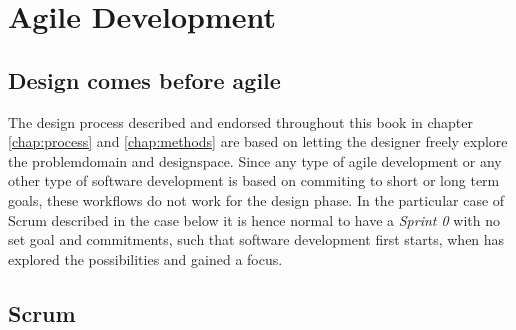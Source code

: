 \section{Agile Development} \label{sec:agile_development}

\begin{concept} \label{conc:agile} 
  
\end{concept}

\subsection{Design comes before agile} \label{sec:design_before_agile}
The design process described and endorsed throughout this book in chapter \ref{chap:process} and \ref{chap:methods} are based on letting the designer freely explore the problemdomain and designspace. Since any type of agile development or any other type of software development is based on commiting to short or long term goals, these workflows do not work for the design phase. In the particular case of Scrum described in the case below it is hence normal to have a \emph{Sprint 0} with no set goal and commitments, such that software development first starts, when has explored the possibilities and gained a focus.

\subsection{Scrum} \label{sec:scrum}

\begin{definition} \label{def:product_owner} 

\end{definition}

\begin{definition} \label{def:scrum_master} 

\end{definition}

\begin{definition} \label{def:product_backlog} 

\end{definition}

\begin{definition}[Sprint] \label{def:sprint} 

\end{definition}

